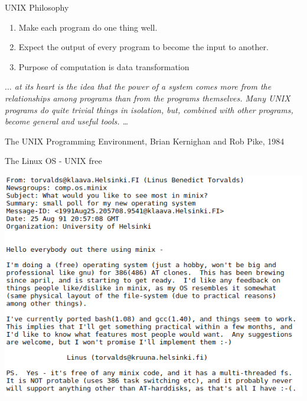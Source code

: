 \documentclass[unknownkeysallowed, 10pt, a4 paper, handout]{beamer}
\begin{document}
\begin{frame}[label=unix]{UNIX Philosophy}
  \begin{enumerate}
    \item Make each program do one thing well. %
    \item Expect the output of every program to become the input to another.
    \item Purpose of computation is data transformation
  \end{enumerate}
  \vfill
  \emph{$\dots$ at its heart is the idea that the power of a system comes
  more from the relationships among programs than from the programs themselves.
  Many UNIX programs do quite trivial things in isolation, but, combined with
  other programs, become general and useful tools. \dots}
  \newline
  \begin{flushright}
  \tiny{The UNIX Programming Environment, Brian Kernighan and Rob Pike, 1984}
  \end{flushright}
\end{frame}


\begin{frame}[label=os]{The Linux OS - UNIX free}
  \begin{center}
    \includegraphics[scale=0.5]{pics/linux-first-announcement-email.png}
  \end{center}
\end{frame}
\end{document}
